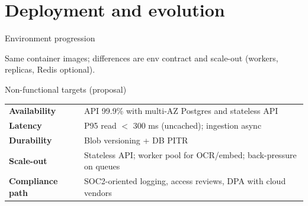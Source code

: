 \documentclass[aspectratio=169,11pt]{beamer}
\begin{document}
\section{Deployment and evolution}

\begin{frame}{Environment progression}
  \centering

  \vspace{0.6em}
  \raggedright
  \small
  Same container images; differences are env contract and scale-out (workers, replicas, Redis optional).
\end{frame}

\begin{frame}{Non-functional targets (proposal)}
  \small
  \begin{tabular}{ll}
    \textbf{Availability} & API 99.9\% with multi-AZ Postgres and stateless API \\
    \textbf{Latency} & P95 read $<$ 300 ms (uncached); ingestion async \\
    \textbf{Durability} & Blob versioning + DB PITR \\
    \textbf{Scale-out} & Stateless API; worker pool for OCR/embed; back-pressure on queues \\
    \textbf{Compliance path} & SOC2-oriented logging, access reviews, DPA with cloud vendors \\
  \end{tabular}
\end{frame}
\end{document}
